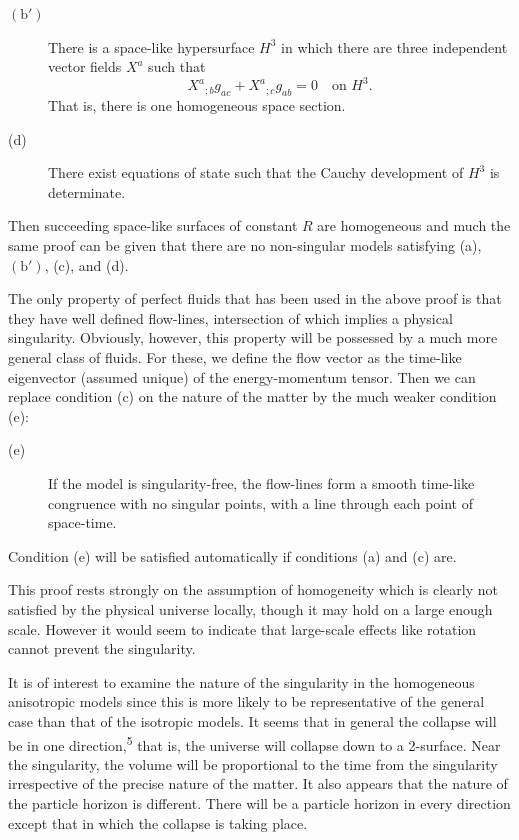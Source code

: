 \begin{description}
\item[$(\mathrm{b}')$] There is a space-like hypersurface $H^3$ in which
there are three independent vector fields $X^a$ such that
\[
X^a{}_{;b}g_{ac}+X^a{}_{;c}g_{ab}=0
\quad\text{on }H^3.
\]
That is, there is one homogeneous space section.

\item[(d)] There exist equations of state such that the Cauchy development of
$H^3$ is determinate.
\end{description}

Then succeeding space-like surfaces of constant $R$ are homogeneous and much
the same proof can be given that there are no non-singular models satisfying
(a), $(\mathrm{b}')$, (c), and (d).

The only property of perfect fluids that has been used in the above proof is
that they have well defined flow-lines, intersection of which implies a
physical singularity. Obviously, however, this property will be possessed by
a much more general class of fluids. For these, we define the flow vector as
the time-like eigenvector (assumed unique) of the energy-momentum tensor. Then
we can replace condition (c) on the nature of the matter by the much weaker
condition (e):

\begin{description}
\item[(e)] If the model is singularity-free, the flow-lines form a smooth
time-like congruence with no singular points, with a line through each point
of space-time.
\end{description}

Condition (e) will be satisfied automatically if conditions (a) and (c) are.

This proof rests strongly on the assumption of homogeneity which is clearly
not satisfied by the physical universe locally, though it may hold on a large
enough scale. However it would seem to indicate that large-scale effects like
rotation cannot prevent the singularity.

It is of interest to examine the nature of the singularity in the homogeneous
anisotropic models since this is more likely to be representative of the
general case than that of the isotropic models. It seems that in general the
collapse will be in one direction,\textsuperscript{5} that is, the universe
will collapse down to a 2-surface. Near the singularity, the volume will be
proportional to the time from the singularity irrespective of the precise
nature of the matter. It also appears that the nature of the particle horizon
is different. There will be a particle horizon in every direction except that
in which the collapse is taking place.

